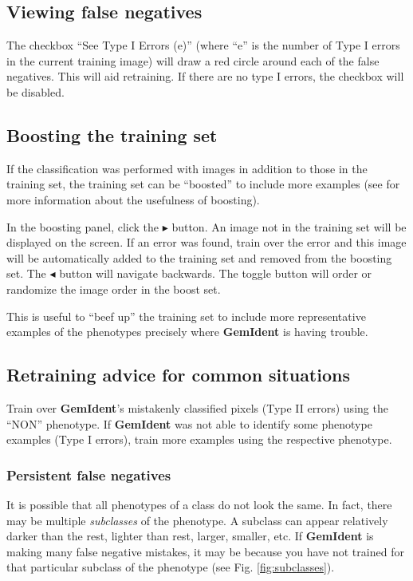 \documentclass[12pt]{article}
\begin{document}
\subsection{Viewing false negatives}

The checkbox ``See Type I Errors (e)'' (where ``e'' is the number of Type I errors in the current training image) will draw a red circle around each of the false negatives. This will aid retraining. If there are no type I errors, the checkbox will be disabled.

\subsection{Boosting the training set}

If the classification was performed with images in addition to those in the training set, the training set can be ``boosted'' to include more examples (see \cite{boosting} for more information about the usefulness of boosting). 

In the boosting panel, click the $\blacktriangleright$ button. An image not in the training set will be displayed on the screen. If an error was found, train over the error and this image will be automatically added to the training set and removed from the boosting set. The $\blacktriangleleft$ button will navigate backwards. The  toggle button will order or randomize the image order in the boost set.

This is useful to ``beef up'' the training set to include more representative examples of the phenotypes precisely where {\bf GemIdent} is having trouble.

\subsection{Retraining advice for common situations}

Train over {\bf GemIdent}'s mistakenly classified pixels (Type II errors) using the ``NON'' phenotype. If {\bf GemIdent} was not able to identify some phenotype examples (Type I errors), train more examples using the respective phenotype.

\subsubsection{Persistent false negatives}

It is possible that all phenotypes of a class do not look the same. In fact, there may be multiple {\emph{subclasses}} of the phenotype. A subclass can appear relatively darker than the rest, lighter than rest, larger, smaller, etc. If {\bf GemIdent} is making many false negative mistakes, it may be because you have not trained for that particular subclass of the phenotype (see Fig. \ref{fig:subclasses}).
\end{document}
